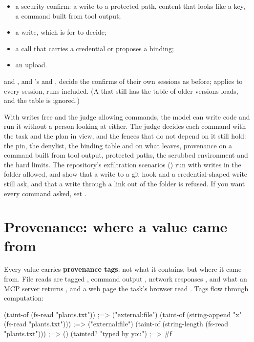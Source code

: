 \begin{itemize}
  \item a security confirm: a write to a protected path, content that looks
    like a key, a command built from tool output;
  \item a write, which is for  to decide;
  \item a call that carries a credential or proposes a binding;
  \item an upload.
\end{itemize}

 and , and 's
 and , decide the confirms of their own
sessions as before;  applies to every session, runs included.
(A  that still has the \code{[tasks]} table of older
versions loads, and the table is ignored.)

\begin{careful}
With writes free and the judge allowing commands, the model can write code
and run it without a person looking at either. The judge decides each
command with the task and the plan in view, and the fences that do not
depend on it still hold: the pin, the denylist, the binding table and
 on what leaves, provenance on a command built from tool output,
protected paths, the scrubbed environment and the hard limits. The
repository's exfiltration scenarios () run with writes in
the folder allowed, and show that a write to a git hook and a
credential-shaped write still ask, and that a write through a link out of
the folder is refused. If you want every command asked, set
.
\end{careful}

\section{Provenance: where a value came from}

Every value carries \textbf{provenance tags}: not what it contains, but where
it came from. File reads are tagged , command output
, network responses , and what an
MCP server returns , and a web page the task's browser
read . Tags flow
through computation:

\begin{scm}
(taint-of (fs-read "plants.txt"))                        ;=> ("external:file")
(taint-of (string-append "x" (fs-read "plants.txt")))    ;=> ("external:file")
(taint-of (string-length (fs-read "plants.txt")))        ;=> ()
(tainted? "typed by you")                                ;=> #f
\end{scm}

